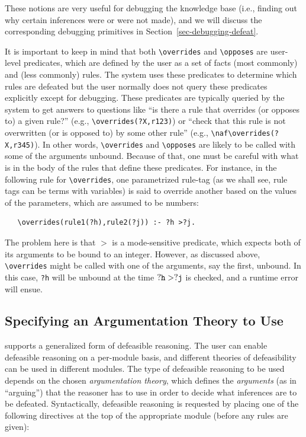\documentclass[11pt]{article}
\newcommand{\ERGO}{\mbox{\smaller{\ensuremath{\cal{E}}\smaller{{\sc{RGO}}}}}\xspace}
\newcommand{\FLSYSTEM}{\ERGO}
\newcommand{\bs}{\textbackslash}
\newcommand{\RULELOGNAF}{{\texttt{{\bs}naf}}\xspace}
\begin{document}
These notions are very useful for debugging the knowledge base (i.e., finding out why
certain inferences were or were not made), and we will discuss the
corresponding debugging primitives in Section~\ref{sec-debugging-defeat}.

It is important to keep in mind that both \texttt{\bs{}overrides} and
\texttt{\bs{}opposes} are user-level predicates, which are defined by the
user as a set of facts (most commonly) and (less commonly) rules. The
system uses these predicates to determine which rules are defeated but the
user normally does not query these predicates explicitly except for
debugging.  These predicates are typically queried by the system to get
answers to questions like ``is there a rule that overrides (or opposes to)
a given rule?'' (e.g., \texttt{\bs{}overrides(?X,r123)}) or
``check that this rule is not overwritten (or is opposed to) by some other
rule'' (e.g., \texttt{\RULELOGNAF\bs{}overrides(?X,r345)}).
In other words, \texttt{\bs{}overrides} and \texttt{\bs{}opposes} are
likely to be called with some of the arguments unbound.
Because of that, one must be careful with what is in the body of the rules
that define these predicates. For instance, in the following rule for
\texttt{\bs{}overrides}, one parametrized rule-tag (as we shall see, rule
tags can be terms with variables) is said to override
another based on the values of the parameters, which are assumed to be
numbers:
\begin{verbatim}
   \overrides(rule1(?h),rule2(?j)) :- ?h >?j.
\end{verbatim}
The problem here is that $>$ is a mode-sensitive predicate, which expects
both of its arguments to be bound to an integer. However, as discussed above,
\texttt{\bs{}overrides} might be called with one of the arguments, say
the first, unbound. In this case, \texttt{?h} will be unbound at the time
$\tt ?h>?j$ is checked, and a runtime error will ensue. 


\subsection{Specifying an Argumentation Theory to Use}

\FLSYSTEM supports a generalized form of defeasible reasoning.
The user can enable defeasible reasoning on a per-module basis, and
different theories of defeasibility can be used in different modules.
The type of defeasible reasoning to be used depends on the chosen
\emph{argumentation theory}, which defines the \emph{arguments} (as in
``arguing'') that the reasoner has to use in order to decide what inferences
are to be defeated. Syntactically, defeasible reasoning is requested
by placing one of the following directives at the top of the
appropriate module (before any rules are given):
\end{document}
